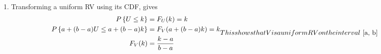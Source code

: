 \begin{enumerate}
\begin{subequations}
\begin{enumerate}
			Applying the above result to the expected value calculation, \\
			
			\begin{align}
				\mathbb{E}[X] &= \sum\limits_{k = 1}^{\infty} k \ (1-p)^{k-1}\ p \nonumber \\
				&= p\ \left[1 + 2(1-p) + 3(1-p)^2 + 4(1-p)^3 + \dots\right]		\nonumber \\
				&= p \left[\frac{1}{p} + \frac{1-p}{p^2}\right]	= \frac{1}{p} \\
			\end{align}\\
				
			\item $ Y $ is a negative binomial RV. Only $ r-1 $ out of the first $ k-1 $ trials can be success. \\
			\begin{align}
				P \left\{Y = k\right\} &= \binom{k-1}{r-1}\ p^{r-1}\ (1-p)^{k-r}\ p \\
			\end{align}
		
			\item Consider $ Y = \sum Y_i $ where the $ Y_i $ are the inter-success intervals. Each of the $ Y_i $ is a geometric RV. Thus,\\
			\begin{align}
				\mathbb{E}[Y] &= \mathbb{E}\left[\sum\limits_{i = 1}^{r} Y_i\right] \nonumber \\
				&= \sum\limits_{i = 1}^{r} \mathbb{E}[Y_i] = \frac{r}{p}
			\end{align}
			
		\end{enumerate}
	\end{subequations}
	
	
	\item Transforming a uniform RV using its CDF, gives\\
	\begin{subequations}
		\begin{align}
			P \left\{U \leq k \right\} &= F_U(k) = k \nonumber \\
			P \left\{a + (b-a)U \leq a + (b-a)k \right\} &= F_V (a + (b-a)k) = k \nonumber \\
			F_V(k) &= \frac{k-a}{b-a}
		\end{align}\\
	
	This shows that V is a uniform RV on the interval $ [a, b] $\\
	\end{subequations} 


\end{enumerate}
